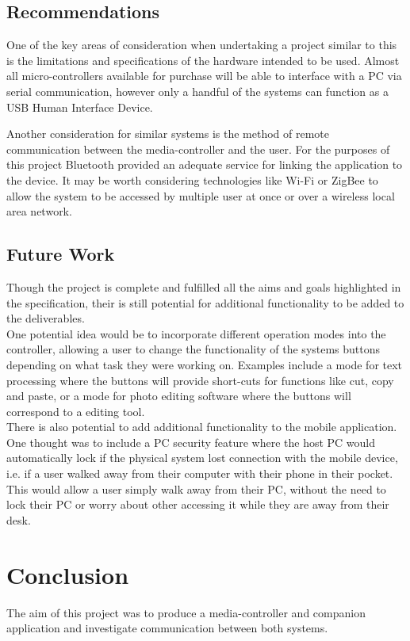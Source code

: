 \documentclass{article}
\begin{document}
		\subsection{Recommendations}
			One of the key areas of consideration when undertaking a project similar to this is the  limitations and specifications of the hardware intended to be used. Almost all micro-controllers available for purchase will be able to interface with a PC via serial communication, however only a handful of the systems can function as a USB Human Interface Device.
			
			Another consideration for similar systems is the method of remote communication between the media-controller and the user. For the purposes of this project Bluetooth provided an adequate service for linking the application to the device. It may be worth considering technologies like Wi-Fi or ZigBee to allow the system to be accessed by multiple user at once or over a wireless local area network. 
			
		\subsection{Future Work}
			Though the project is complete and fulfilled all the aims and goals highlighted in the specification, their is still potential for additional functionality to be added to the deliverables.\\
			
			\noindent
			One potential idea would be to incorporate different operation modes into the controller, allowing a user to change the functionality of the systems buttons depending on what task they were working on. Examples include a mode for text processing where the buttons will provide short-cuts for functions like cut, copy and paste, or a mode for photo editing software where the buttons will correspond to a editing tool.\\
			
			\noindent
			There is also potential to add additional functionality to the mobile application. One thought was to include a PC security feature where the host PC would automatically lock if the physical system lost connection with the mobile device, i.e. if a user walked away from their computer with their phone in their pocket. This would allow a user simply walk away from their PC, without the need to lock their PC or worry about other accessing it while they are away from their desk.
		
	\section{Conclusion}
		The aim of this project was to produce a media-controller and companion application and investigate communication between both systems. 
		
\end{document}
